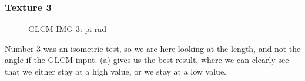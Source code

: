 \documentclass{article}
\begin{document}
	\subsubsection{Texture 3}
		\begin{figure}[h]%
			\centering
    		\qquad
    		\qquad
    		\qquad

    		\caption{GLCM IMG 3: pi rad}%
    		\label{fig:GLCM_3}%
		\end{figure}
		Number 3 was an isometric test, so we are here looking at the length, and not the angle if the GLCM input. (a) gives us the best result, where we can clearly see that we either stay at a high value, or we stay at a low value.
\newpage
\end{document}
